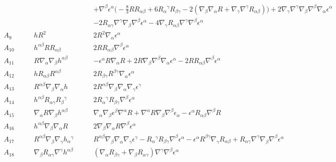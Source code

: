 \documentclass[10pt,letterpaper]{article}
\numberwithin{equation}{section}
\begin{document}
\begin{eqnarray}
& & + \nabla^{\beta }\epsilon^{\alpha } \bigl(- \tfrac{8}{3} R R_{\alpha \beta } + 6 R_{\alpha }{}^{\gamma } R_{\beta \gamma } - 2 (\nabla_{\beta }\nabla_{\alpha }R + \nabla_{\gamma }\nabla^{\gamma }R_{\alpha \beta })\bigr) + 2 \nabla_{\gamma }\nabla^{\gamma }\nabla_{\beta }\nabla^{\beta }\nabla_{\alpha }\epsilon^{\alpha }
\nonumber\\
& &
- 2 R_{\alpha \gamma } \nabla^{\gamma }\nabla_{\beta }\nabla^{\beta }\epsilon^{\alpha } - 4 \nabla_{\gamma }R_{\alpha \beta } \nabla^{\gamma }\nabla^{\beta }\epsilon^{\alpha }
\nonumber\\
A_{9}{}\qquad&
h R^2\qquad&
2 R^2 \nabla_{\alpha }\epsilon^{\alpha }
\nonumber\\
A_{10}{}\qquad&
h^{\alpha \beta } R R_{\alpha \beta }\qquad&
2 R R_{\alpha \beta } \nabla^{\beta }\epsilon^{\alpha }
\nonumber\\
A_{11}{}\qquad&
R \nabla_{\alpha }\nabla_{\beta }h^{\alpha \beta }\qquad&
- \epsilon^{\alpha } R \nabla_{\alpha }R + 2 R \nabla_{\beta }\nabla^{\beta }\nabla_{\alpha }\epsilon^{\alpha } - 2 R R_{\alpha \beta } \nabla^{\beta }\epsilon^{\alpha }
\nonumber\\
A_{12}{}\qquad&
h R_{\alpha \beta } R^{\alpha \beta }\qquad&
2 R_{\beta \gamma } R^{\beta \gamma } \nabla_{\alpha }\epsilon^{\alpha }
\nonumber\\
A_{13}{}\qquad&
R^{\alpha \beta } \nabla_{\beta }\nabla_{\alpha }h\qquad&
2 R^{\alpha \beta } \nabla_{\beta }\nabla_{\alpha }\nabla_{\gamma }\epsilon^{\gamma }
\nonumber\\
A_{14}{}\qquad&
h^{\alpha \beta } R_{\alpha \gamma } R_{\beta }{}^{\gamma }\qquad&
2 R_{\alpha }{}^{\gamma } R_{\beta \gamma } \nabla^{\beta }\epsilon^{\alpha }
\nonumber\\
A_{15}{}\qquad&
\nabla_{\alpha }R \nabla_{\beta }h^{\alpha \beta }\qquad&
\nabla_{\alpha }\nabla_{\beta }\epsilon^{\beta } \nabla^{\alpha }R + \nabla^{\alpha }R \nabla_{\beta }\nabla^{\beta }\epsilon_{\alpha } -  \epsilon^{\alpha } R_{\alpha \beta } \nabla^{\beta }R
\nonumber\\
A_{16}{}\qquad&
h^{\alpha \beta } \nabla_{\beta }\nabla_{\alpha }R\qquad&
2 \nabla_{\beta }\nabla_{\alpha }R \nabla^{\beta }\epsilon^{\alpha }
\nonumber\\
A_{17}{}\qquad&
R^{\alpha \beta } \nabla_{\beta }\nabla_{\gamma }h_{\alpha }{}^{\gamma }\qquad&
R^{\alpha \beta } \nabla_{\beta }\nabla_{\alpha }\nabla_{\gamma }\epsilon^{\gamma } -  R_{\alpha }{}^{\gamma } R_{\beta \gamma } \nabla^{\beta }\epsilon^{\alpha } -  \epsilon^{\alpha } R^{\beta \gamma } \nabla_{\gamma }R_{\alpha \beta } + R_{\alpha \gamma } \nabla^{\gamma }\nabla_{\beta }\nabla^{\beta }\epsilon^{\alpha }
\nonumber\\
A_{18}{}\qquad&
\nabla_{\beta }R_{\alpha \gamma } \nabla^{\gamma }h^{\alpha \beta }\qquad&
(\nabla_{\alpha }R_{\beta \gamma } + \nabla_{\beta }R_{\alpha \gamma }) \nabla^{\gamma }\nabla^{\beta }\epsilon^{\alpha }
\end{eqnarray}
\end{document}
